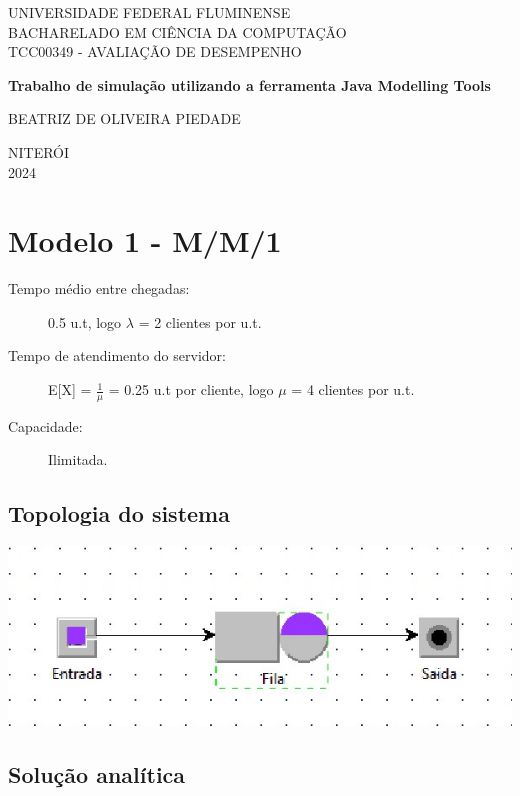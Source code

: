 \documentclass[12pt,a4paper]{article}
\begin{document}
	
\begin{titlepage}
	\centering
	\vspace{2cm}
	
	{UNIVERSIDADE FEDERAL FLUMINENSE} \\ [0.1cm]
	{BACHARELADO EM CIÊNCIA DA COMPUTAÇÃO} \\ [0.1cm]
	{TCC00349 - AVALIAÇÃO DE DESEMPENHO}
	
	\vfill
	
	{\Large \bfseries Trabalho de simulação utilizando a ferramenta Java Modelling Tools}
	
	\vfill
	
	{BEATRIZ DE OLIVEIRA PIEDADE}
	
	\vfill
	{NITERÓI} \\
	{2024}
\end{titlepage}

\newpage
\section{Modelo 1 - M/M/1}

\begin{description}
	\item[Tempo médio entre chegadas:] 0.5 u.t, logo $\lambda$ = 2 clientes por u.t.
	\item[Tempo de atendimento do servidor:] E[X] = $\frac{1}{\mu}$ = 0.25 u.t por cliente, logo $\mu$ = 4 clientes por u.t.
	\item[Capacidade:] Ilimitada.
\end{description}

\subsection{Topologia do sistema}
\includegraphics[width=\linewidth]{topologias/m1.jpg}

\subsection{Solução analítica}
\end{document}
